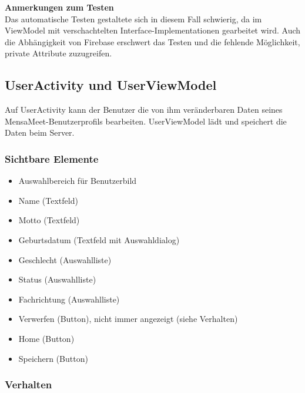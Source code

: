 \documentclass[a4paper]{scrreprt}
\begin{document}
\textbf{Anmerkungen zum Testen}\\
Das automatische Testen gestaltete sich in diesem Fall schwierig, da im ViewModel mit verschachtelten Interface-Implementationen gearbeitet wird. Auch die Abhängigkeit von Firebase erschwert das Testen und die fehlende Möglichkeit, private Attribute zuzugreifen.

\subsection{UserActivity und UserViewModel}
Auf UserActivity kann der Benutzer die von ihm veränderbaren Daten seines MensaMeet-Benutzerprofils bearbeiten. UserViewModel lädt und speichert die Daten beim Server. 

\subsubsection{Sichtbare Elemente}

\begin{itemize}
\item Auswahlbereich für Benutzerbild
\item Name (Textfeld)
\item Motto (Textfeld)
\item Geburtsdatum (Textfeld mit Auswahldialog)
\item Geschlecht (Auswahlliste)
\item Status (Auswahlliste)
\item Fachrichtung (Auswahlliste)
\item Verwerfen (Button), nicht immer angezeigt (siehe Verhalten)
\item Home (Button) 
\item Speichern (Button)

\end{itemize}

\subsubsection{Verhalten}
\end{document}
